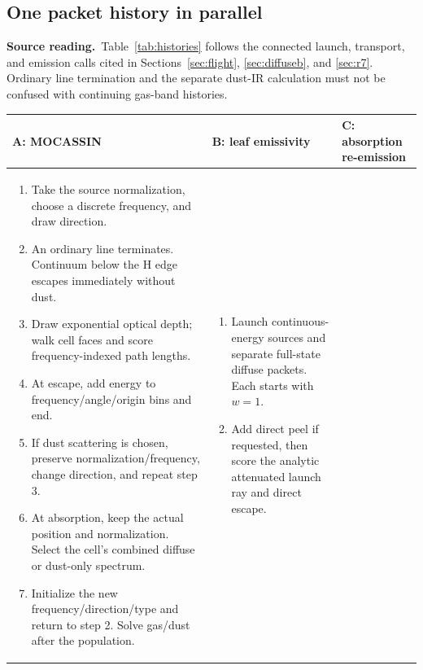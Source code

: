 \documentclass[english,a4paper]{my_memo}
\newcommand{\Source}{\noindent\textbf{Source reading.}\ }
\begin{document}
\subsection{One packet history in parallel}
\label{sec:histories}
\Source Table~\ref{tab:histories} follows the connected launch,
transport, and emission calls cited in Sections~\ref{sec:flight},
\ref{sec:diffuseb}, and \ref{sec:r7}. Ordinary line termination and the
separate dust-IR calculation must not be confused with continuing
gas-band histories.
\begin{table}[p]
\centering\small\setlength{\tabcolsep}{5pt}
\begin{tabular}{@{}P{.305\linewidth}P{.305\linewidth}P{.305\linewidth}@{}}
\toprule A: MOCASSIN & B: leaf emissivity & C: absorption re-emission\\\midrule
\begin{minipage}[t]{\linewidth}\vspace{0pt}
\begin{enumerate}[leftmargin=1.35em,itemsep=6pt]
\item Take the source normalization, choose a discrete frequency, and draw direction.
\item An ordinary line terminates. Continuum below the H edge escapes immediately without dust.
\item Draw exponential optical depth; walk cell faces and score frequency-indexed path lengths.
\item At escape, add energy to frequency/angle/origin bins and end.
\item If dust scattering is chosen, preserve normalization/frequency, change direction, and repeat step 3.
\item At absorption, keep the actual position and normalization. Select the cell's combined diffuse or dust-only spectrum.
\item Initialize the new frequency/direction/type and return to step 2. Solve gas/dust after the population.
\end{enumerate}\end{minipage}
&\begin{minipage}[t]{\linewidth}\vspace{0pt}
\begin{enumerate}[leftmargin=1.35em,itemsep=6pt]
\item Launch continuous-energy sources and separate full-state diffuse packets. Each starts with $w=1$.
\item Add direct peel if requested, then score the analytic attenuated launch ray and direct escape.

\end{enumerate}
\end{minipage}
\end{tabular}
\end{table}
\end{document}

